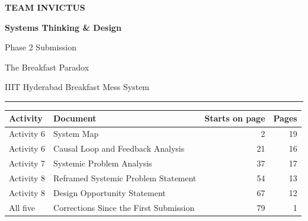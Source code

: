 \documentclass[
  10pt,
  table]{article}
\author{}
\date{}
\begin{document}
\thispagestyle{empty}
\vspace*{1.3in}
\begin{center}
{\color{pblue2}\fontsize{14}{16}\selectfont\bfseries TEAM INVICTUS\par}
\vspace{16pt}
{\color{pblue}\fontsize{32}{38}\selectfont\bfseries Systems Thinking \& Design\par Phase 2 Submission\par}
\vspace{14pt}
{\color{pslate}\Large The Breakfast Paradox\par}
{\color{pslate}\normalsize IIIT Hyderabad Breakfast Mess System\par}
\vspace{18pt}
{\color{prule}\rule{2.6in}{1.4pt}}
\end{center}
\vspace{22pt}
\begin{center}
\renewcommand{\arraystretch}{1.5}
\footnotesize
\begin{tabular}{@{}p{1.0in}p{3.7in}rr@{}}
\textbf{\color{pblue}Activity} & \textbf{\color{pblue}Document} & \textbf{\color{pblue}Starts on page} & \textbf{\color{pblue}Pages}\\
\hline
Activity 6 & System Map & 2 & 19 \\
Activity 6 & Causal Loop and Feedback Analysis & 21 & 16 \\
Activity 7 & Systemic Problem Analysis & 37 & 17 \\
Activity 8 & Reframed Systemic Problem Statement & 54 & 13 \\
Activity 8 & Design Opportunity Statement & 67 & 12 \\
All five & Corrections Since the First Submission & 79 & 1 \\
\end{tabular}
\end{center}
\end{document}
